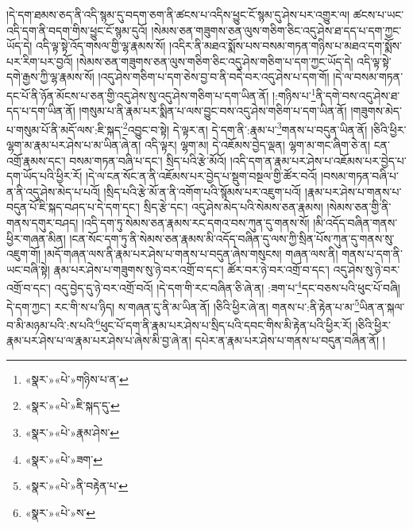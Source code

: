 །དེ་དག་ཐམས་ཅད་ནི་འདི་སྙམ་དུ་བདག་ཅག་ནི་ཚངས་པ་འདིས་ཕྱུང་ངོ་སྙམ་དུ་ཤེས་པར་འགྱུར་ལ། ཚངས་པ་ཡང་འདི་དག་ནི་བདག་གིས་ཕྱུང་ངོ་སྙམ་དུའོ། །སེམས་ཅན་གཟུགས་ཅན་ལུས་གཅིག་ཅིང་འདུ་ཤེས་ཐ་དད་པ་དག་ཀྱང་ཡོད་དེ། འདི་ལྟ་སྟེ་འོད་གསལ་གྱི་ལྷ་རྣམས་སོ། །འདིར་ནི་མཐའ་སྨོས་པས་བསམ་གཏན་གཉིས་པ་མཐའ་དག་སྨོས་པར་རིག་པར་བྱའོ། །སེམས་ཅན་གཟུགས་ཅན་ལུས་གཅིག་ཅིང་འདུ་ཤེས་གཅིག་པ་དག་ཀྱང་ཡོད་དེ། འདི་ལྟ་སྟེ་དགེ་རྒྱས་ཀྱི་ལྷ་རྣམས་སོ། །འདུ་ཤེས་གཅིག་པ་དག་ཅེས་བྱ་བ་ནི་བདེ་བར་འདུ་ཤེས་པ་དག་གོ། །དེ་ལ་བསམ་གཏན་དང་པོ་ནི་ཉོན་མོངས་པ་ཅན་གྱི་འདུ་ཤེས་སུ་འདུ་ཤེས་གཅིག་པ་དག་ཡིན་ནོ། །:གཉིས་པ་\footnote{«སྣར་»«པེ་»གཉིས་པ་ན་}ནི་དགེ་བས་འདུ་ཤེས་ཐ་དད་པ་དག་ཡིན་ནོ། །གསུམ་པ་ནི་རྣམ་པར་སྨིན་པ་ལས་བྱུང་བས་འདུ་ཤེས་གཅིག་པ་དག་ཡིན་ནོ། །གཟུགས་མེད་པ་གསུམ་པོ་ནི་མདོ་ལས་:ཇི་སྐད་\footnote{«སྣར་»«པེ་»ཇི་སྐད་དུ་}འབྱུང་བ་སྟེ། དེ་ལྟར་ན། དེ་དག་ནི་:རྣམ་པ་\footnote{«སྣར་»«པེ་»རྣམ་ཤེས་}གནས་པ་བདུན་ཡིན་ནོ། །ཅིའི་ཕྱིར་ལྷག་མ་རྣམ་པར་ཤེས་པ་མ་ཡིན་ཞེ་ན། འདི་ལྟར། ལྷག་མ། དེ་འཇོམས་བྱེད་ལྡན། ལྷག་མ་གང་ཞིག་ཅེ་ན། ངན་འགྲོ་རྣམས་དང་། བསམ་གཏན་བཞི་པ་དང་། སྲིད་པའི་རྩེ་མོའོ། །འདི་དག་ན་རྣམ་པར་ཤེས་པ་འཇོམས་པར་བྱེད་པ་དག་ཡོད་པའི་ཕྱིར་རོ། །དེ་ལ་ངན་སོང་ན་ནི་འཇོམས་པར་བྱེད་པ་སྡུག་བསྔལ་གྱི་ཚོར་བའོ། །བསམ་གཏན་བཞི་པ་ན་ནི་འདུ་ཤེས་མེད་པ་པའོ། །སྲིད་པའི་རྩེ་མོ་ན་ནི་འགོག་པའི་སྙོམས་པར་འཇུག་པའོ། །རྣམ་པར་ཤེས་པ་གནས་པ་བདུན་པོ་ཇི་སྐད་བཤད་པ་དེ་དག་དང་། སྲིད་རྩེ་དང་། འདུ་ཤེས་མེད་པའི་སེམས་ཅན་རྣམས། །སེམས་ཅན་གྱི་ནི་གནས་དགུར་བཤད། །འདི་དག་ཏུ་སེམས་ཅན་རྣམས་རང་དགའ་བས་ཀུན་དུ་གནས་སོ། །མི་འདོད་བཞིན་གནས་ཕྱིར་གཞན་མིན། །ངན་སོང་དག་ཏུ་ནི་སེམས་ཅན་རྣམས་མི་འདོད་བཞིན་དུ་ལས་ཀྱི་སྲིན་པོས་ཀུན་དུ་གནས་སུ་འཇུག་གོ། །མདོ་གཞན་ལས་ནི་རྣམ་པར་ཤེས་པ་གནས་པ་བདུན་ཞེས་གསུངས། གཞན་ལས་ནི། གནས་པ་དག་ནི་ཡང་བཞི་སྟེ། རྣམ་པར་ཤེས་པ་གཟུགས་སུ་ཉེ་བར་འགྲོ་བ་དང་། ཚོར་བར་ཉེ་བར་འགྲོ་བ་དང་། འདུ་ཤེས་སུ་ཉེ་བར་འགྲོ་བ་དང་། འདུ་བྱེད་དུ་ཉེ་བར་འགྲོ་བའོ། །དེ་དག་གི་རང་བཞིན་ཅི་ཞེ་ན། :ཟག་པ་\footnote{«སྣར་»«པེ་»ཟག་}དང་བཅས་པའི་ཕུང་པོ་བཞི། དེ་དག་ཀྱང་། རང་གི་ས་པ་ཉིད། ས་གཞན་དུ་ནི་མ་ཡིན་ནོ། །ཅིའི་ཕྱིར་ཞེ་ན། གནས་པ་:ནི་རྟེན་པ་མ་\footnote{«སྣར་»«པེ་»ནི་བརྟེན་པ་}ཡིན་ན་སྐལ་བ་མི་མཉམ་པའི་:ས་པའི་\footnote{«སྣར་»«པེ་»ས་}ཕུང་པོ་དག་ནི་རྣམ་པར་ཤེས་པ་སྲིད་པའི་དབང་གིས་མི་རྟེན་པའི་ཕྱིར་རོ། །ཅིའི་ཕྱིར་རྣམ་པར་ཤེས་པ་ལ་རྣམ་པར་ཤེས་པ་ཞེས་མི་བྱ་ཞེ་ན། དཔེར་ན་རྣམ་པར་ཤེས་པ་གནས་པ་བདུན་བཞིན་ནོ། །
